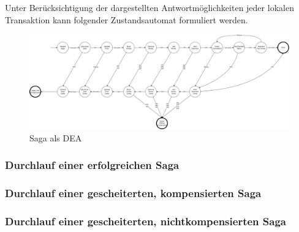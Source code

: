 Unter Berücksichtigung der dargestellten Antwortmöglichkeiten jeder lokalen Transaktion kann folgender Zustandsautomat formuliert werden.

\begin{figure}[h!]
	\centering
	\includegraphics[width=\linewidth]{figures/DatabaseER/DEA_No_NetworkErrors_No_Retries.png}
	\caption{Saga als DEA}
\end{figure}
\FloatBarrier

\subsubsection{Durchlauf einer erfolgreichen Saga}

\subsubsection{Durchlauf einer gescheiterten, kompensierten Saga}

\subsubsection{Durchlauf einer gescheiterten, nichtkompensierten Saga}

\section{}